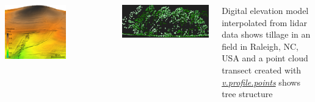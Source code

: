 \documentclass[25pt, margin=0mm, innermargin=25mm, blockverticalspace=25mm, colspace=25mm, subcolspace=8mm]{tikzposter}
\newcommand{\gamodule}[1]{\href{http://grass.osgeo.org/grass74/manuals/addons/#1.html}{\emph{#1}}}
\begin{document}
\begin{columns}
{\centering
\begin{minipage}{0.4\linewidth}
\centering
\includegraphics[width=0.7\textwidth]{elevation_lidar}
\end{minipage}
~
\begin{minipage}{0.55\linewidth}
\centering
\includegraphics[width=\textwidth]{lidar_profile}
\end{minipage}
\vspace{2mm}
\begin{center}
Digital elevation model interpolated from lidar data shows tillage in an field in Raleigh, NC, USA
and a point cloud transect created with \gamodule{v.profile.points} shows tree structure
\end{center}

}

\end{columns}
\end{document}
